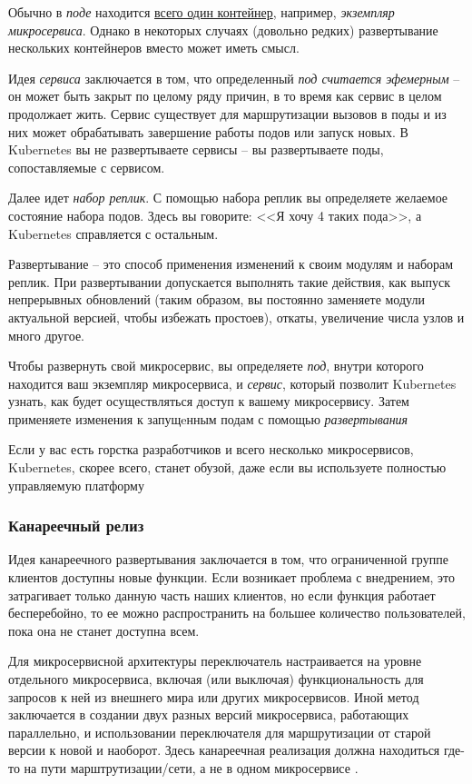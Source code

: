 \documentclass[%
	11pt,
	a4paper,
	utf8,
		]{article}
\begin{document}
Обычно в \emph{поде} находится \underline{всего один контейнер}, например, \emph{экземпляр микросервиса}. Однако в некоторых случаях (довольно редких) развертывание нескольких контейнеров вместо может иметь смысл. 

Идея \emph{сервиса} заключается в том, что определенный \emph{под считается эфемерным} -- он может быть закрыт по целому ряду причин, в то время как сервис в целом продолжает жить. Сервис существует для маршрутизации вызовов в поды и из них может обрабатывать завершение работы подов или запуск новых. В Kubernetes вы не развертываете сервисы -- вы развертываете поды, сопоставляемые с сервисом. 

Далее идет \emph{набор реплик}. С помощью набора реплик вы определяете желаемое состояние набора подов. Здесь вы говорите: <<Я хочу 4 таких пода>>, а Kubernetes справляется с остальным.

Развертывание -- это способ применения изменений к своим модулям и наборам реплик. При развертывании допускается выполнять такие действия, как выпуск непрерывных обновлений (таким образом, вы постоянно заменяете модули актуальной версией, чтобы избежать простоев), откаты, увеличение числа узлов и много другое.

{\color{blue} Чтобы развернуть свой микросервис, вы определяете \emph{под}, внутри которого находится ваш экземпляр микросервиса, и \emph{сервис}, который позволит Kubernetes узнать, как будет осуществляться доступ к вашему микросервису. Затем применяете изменения к запущeнным подам с помощью \emph{развертывания}} \cite[]{microservices-2024}

{\color{red}Если у вас есть горстка разработчиков и всего несколько микросервисов, Kubernetes, скорее всего, станет обузой, даже если вы используете полностью управляемую платформу} \cite[]{microservices-2024}

\subsubsection{Канареечный релиз}

Идея канареечного развертывания заключается в том, что ограниченной группе клиентов доступны новые функции. Если возникает проблема с внедрением, это затрагивает только данную часть наших клиентов, но если функция работает бесперебойно, то ее можно распространить на большее количество пользователей, пока она не станет доступна всем.

Для микросервисной архитектуры переключатель настраивается на уровне отдельного микросервиса, включая (или выключая) функциональность для запросов к ней из внешнего мира или других микросервисов. Иной метод заключается в создании двух разных версий микросервиса, работающих параллельно, и использовании переключателя для маршрутизации от старой версии к новой и наоборот. Здесь канареечная реализация должна находиться где-то на пути марштрутизации/сети, а не в одном микросервисе \cite[]{microservices-2024}. 
\end{document}
